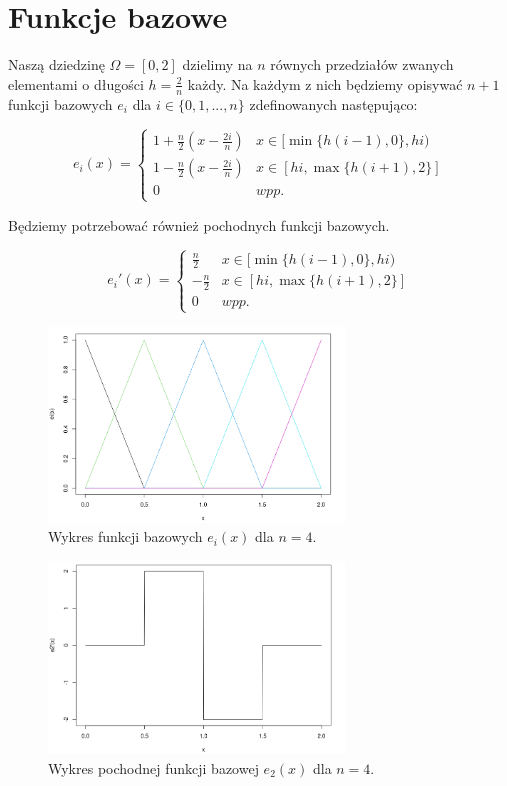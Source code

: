 \documentclass{article}
\begin{document}
\cleardoublepage
\section{Funkcje bazowe}

Naszą dziedzinę \( \Omega = [0, 2] \) dzielimy na \( n \) równych przedziałów zwanych elementami o długości \( h = \frac{2}{n} \) każdy. Na każdym z nich będziemy opisywać \( n + 1 \) funkcji bazowych \( e_i \) dla \( i \in \{0, 1, ..., n\} \) zdefinowanych następująco:

\[
    e_i(x) =
    \begin{cases}
        1 + \frac{n}{2}(x - \frac{2i}{n}) & x \in [\min\{h(i - 1), 0\}, hi) \\
        1 - \frac{n}{2}(x - \frac{2i}{n}) & x \in [hi,\max\{h(i+1), 2\}] \\
        0 & wpp.
    \end{cases}
\]

Będziemy potrzebować również pochodnych funkcji bazowych.

\[
    e_i'(x) =
    \begin{cases}
        \frac{n}{2} & x \in [\min\{h(i - 1), 0\}, hi) \\
        -\frac{n}{2} & x \in [hi,\max\{h(i+1), 2\}] \\
        0 & wpp.
    \end{cases}
\]

\begin{figure}[h]
    \centering
    \includegraphics[width=0.7\textwidth]{img/base_functions.png}
    \caption{Wykres funkcji bazowych \( e_i(x) \) dla \( n = 4 \).}
\end{figure}

\begin{figure}[h]
    \centering
    \includegraphics[width=0.7\textwidth]{img/derivative.png}
    \caption{Wykres pochodnej funkcji bazowej \( e_2(x) \) dla \( n = 4 \).}
\end{figure}
\end{document}
